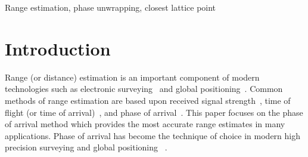 \documentclass[10pt,twocolumn,twoside]{IEEEtran}
\begin{document}
\begin{abstract}
\end{abstract}
%
\begin{IEEEkeywords}
Range estimation, phase unwrapping, closest lattice point
\end{IEEEkeywords}
%
\section{Introduction}\label{sec:intro}

\newcommand{\lcm}{\operatorname{lcm}}

Range (or distance) estimation is an important component of modern technologies such as electronic surveying~\cite{Jacobs_ambiguity_resolution_interferometery_1981, anderson1998surveying} and global positioning~\cite{Teunissen_GPS_LAMBDA_2006,Teunissen_GPS_1995}.  Common methods of range estimation are based upon received signal strength~\cite{Chitte_RSS_Estimation2009, HingCheung_RSSbasedRangeEstimation2012}, time of flight (or time of arrival)~\cite{XinrongLi_TOA_range_estimation2004, Lanzisera_TOA_range_estimation2011}, and phase of arrival~\cite{Jacobs_ambiguity_resolution_interferometery_1981,Towers_frequency_selection_interferometry_2003,Li_distance_est_wrapped_phase}.  This paper focuses on the phase of arrival method which provides the most accurate range estimates in many applications.  Phase of arrival has become the technique of choice in modern high precision surveying and global positioning ~\cite{Odijk-nteger-ambiguity-resolutionPPP, Teunissen_GPS_LAMBDA_2006, Teunissen_GPS_1995}.
 
\end{document}
